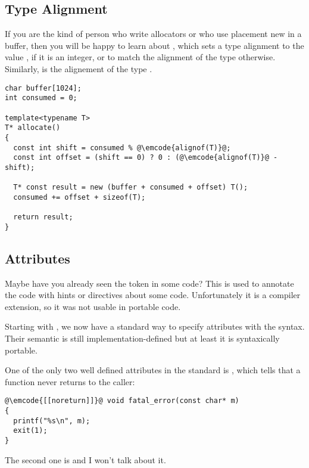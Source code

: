 \subsection{Type Alignment}

If you are the kind of person who write allocators or who use
placement new in a buffer, then you will be happy to learn
about , which sets a type alignment to the
value , if it is an integer, or to match the alignment of the
type  otherwise. Similarly,  is the
alignement of the type .

\begin{lstlisting}
char buffer[1024];
int consumed = 0;

template<typename T>
T* allocate()
{
  const int shift = consumed % @\emcode{alignof(T)}@;
  const int offset = (shift == 0) ? 0 : (@\emcode{alignof(T)}@ - shift);

  T* const result = new (buffer + consumed + offset) T();
  consumed += offset + sizeof(T);

  return result;
}
\end{lstlisting}

\subsection{Attributes}

Maybe have you already seen the  token in
some \cpp{} code? This is used to annotate the code with hints or
directives about some code. Unfortunately it is a compiler extension,
so it was not usable in portable code.

Starting with , we now have a standard way to specify attributes
with the  syntax. Their semantic is still
implementation-defined but at least it is syntaxically portable.

One of the only two well defined attributes in the 
standard is \code{[[noreturn]]}, which tells that a function never
returns to the caller:

\begin{lstlisting}
@\emcode{[[noreturn]]}@ void fatal_error(const char* m)
{
  printf("%s\n", m);
  exit(1);
}
\end{lstlisting}

The second one is  and I won't talk
about it.
